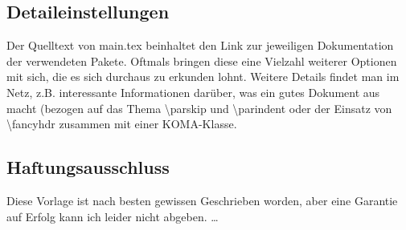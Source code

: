 \subsection{Detaileinstellungen}
\label{detail-grundl}
Der Quelltext von main.tex beinhaltet den Link zur jeweiligen Dokumentation der verwendeten Pakete. Oftmals bringen diese eine Vielzahl weiterer Optionen mit sich, die es sich durchaus zu erkunden lohnt.
Weitere Details findet man im Netz, z.B.  interessante Informationen darüber, was ein gutes Dokument aus macht (bezogen auf das Thema \textbackslash parskip und \textbackslash parindent oder der Einsatz von \textbackslash fancyhdr zusammen mit einer KOMA-Klasse.
\subsection{Haftungsausschluss}
\label{sec:haftausschl}
Diese Vorlage ist nach besten gewissen Geschrieben worden, aber eine Garantie auf Erfolg kann ich leider nicht abgeben.
\dots
